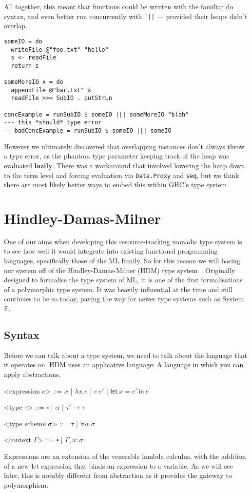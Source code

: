 All together, this meant that functions could be written with the
familiar do syntax, and even better run concurrently with
\texttt{|||} --- provided their heaps didn't overlap.
\begin{verbatim}
someIO = do
  writeFile @"foo.txt" "hello"
  s <- readFile
  return s

someMoreIO x = do
  appendFile @"bar.txt" x
  readFile >>= SubIO . putStrLn

concExample = runSubIO $ someIO ||| someMoreIO "blah"
--- this *should* type error
-- badConcExample = runSubIO $ someIO ||| someIO
\end{verbatim}
However we ultimately discovered that overlapping instances don't
always throw a type error, as the phantom type parameter keeping track
of the heap was evaluated \textbf{lazily}. There was a workaround that
involved lowering the heap down to the term level and forcing
evaluation via \texttt{Data.Proxy} and
\texttt{seq}, but we think there are most likely better
ways to embed this within GHC's type system.

\section{Hindley-Damas-Milner}

One of our aims when developing this resource-tracking monadic type
system is to see how well it would integrate into existing functional
programming languages, specifically those of the ML family. So for
this reason we will basing our system off of the Hindley-Damas-Milner
(HDM) type system~\cite{damas1982}. Originally designed to formalise
the type system of ML, it is one of the first formalisations of a
polymorphic type system. It was heavily influential at the time and
still continues to be so today, paving the way for newer type systems
such as System F. 

\subsection{Syntax}

Before we can talk about a type system, we need to talk about the
language that it operates on. HDM uses an applicative language: A
language in which you can apply abstractions.
\def\defaultHypSeparation{\hskip .05in}
\newcommand{\letin}[2]{\mathsf{let} \ #1 \ \mathsf{in} \ #2}
\begin{grammar}

  <expression $e$> ::= $x$ | $\lambda x . e$ | $e \ e'$ | $\letin{x=e'}{e}$ %

  <type $\tau$> ::= $\square$ | $\alpha$ | $\tau' \rightarrow \tau$
  
  <type scheme $\sigma$> ::= $\tau$ | $\forall \alpha . \sigma$

  <context $\Gamma$> ::= $\centerdot$ | $\Gamma, x : \sigma$

\end{grammar}
Expressions are an extension of the venerable lambda calculus, with the
addition of a new let expression that binds an expression to a
variable. As we will see later, this is notably different from
abstraction as it provides the gateway to polymorphism.

